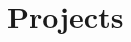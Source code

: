 \documentclass[letterpaper,11pt]{article}
\makeatletter
\newcommand{\resumeItem}[1]{
  \item\small{{#1 \vspace{-2pt}}}
}
\newcommand{\resumeProjectHeading}[2]{
    \item
    \begin{tabularx}{1.001\textwidth}[t]{@{}>{\raggedright\arraybackslash}X@{\hspace{8pt}}r@{}}
      \small#1 & \textbf{\small #2}\\
    \end{tabularx}\vspace{-7pt}
}
\newcommand{\resumeSubHeadingListStart}{\begin{itemize}[leftmargin=0.0in, label={}]}
\newcommand{\resumeSubHeadingListEnd}{\end{itemize}}
\newcommand{\resumeItemListStart}{\begin{itemize}}
\newcommand{\resumeItemListEnd}{\end{itemize}\vspace{-5pt}}
\makeatother
\begin{document}
\section{Projects}
    \vspace{-5pt}
%
%
\vspace{-12pt}
 
\end{document}
